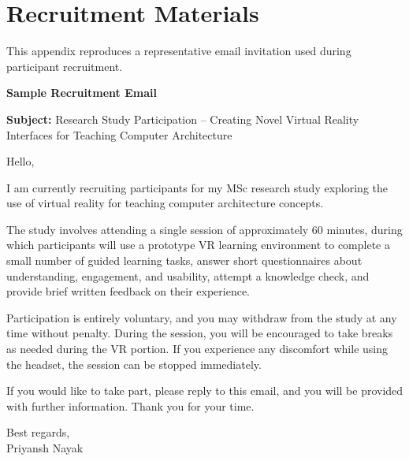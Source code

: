 \chapter{Recruitment Materials}
\label{app:recruitment}

\begingroup
\setlength{\parindent}{0pt}
\setlength{\parskip}{0.5em}

This appendix reproduces a representative email invitation used during participant recruitment.

\textbf{Sample Recruitment Email}

\textbf{Subject:} Research Study Participation -- Creating Novel Virtual Reality Interfaces for Teaching Computer Architecture

Hello,

I am currently recruiting participants for my MSc research study exploring the use of virtual reality for teaching computer architecture concepts.

The study involves attending a single session of approximately 60 minutes, during which participants will use a prototype VR learning environment to complete a small number of guided learning tasks, answer short questionnaires about understanding, engagement, and usability, attempt a knowledge check, and provide brief written feedback on their experience.

Participation is entirely voluntary, and you may withdraw from the study at any time without penalty. During the session, you will be encouraged to take breaks as needed during the VR portion. If you experience any discomfort while using the headset, the session can be stopped immediately.

If you would like to take part, please reply to this email, and you will be provided with further information. Thank you for your time.

Best regards,\\
Priyansh Nayak\\

\endgroup
